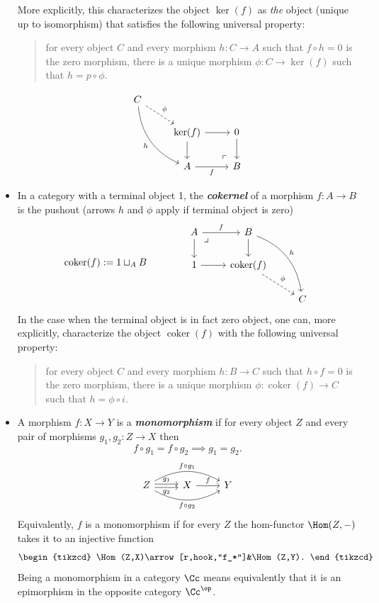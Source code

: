 \begin{defn}
\begin{itemize}
		More explicitly, this characterizes the object $\ker(f)$ as \textit{the} object (unique up to isomorphism) that satisfies the following universal property:
		\begin{quote}
			for every object $C$ and every morphism $h:C\to A$ such that $f\circ h=0$ is the zero morphism, there is a unique morphism $\phi:C\to\ker(f)$ such that $h=p\circ\phi$.
		\end{quote}
		\[\begin{tikzcd}
			C\arrow[dr,dashed,"\phi"]\arrow[ddr,bend right,swap,"h"]\\
			&\ker(f)\arrow[d]\arrow[r]&0\arrow[d]\\
			&A\arrow[r,"f",swap]&B\arrow[ul, phantom, "\ulcorner", very near start]
		\end{tikzcd}\]
		\item In a category with a terminal object 1, the \textbf{\textit{cokernel}} of a morphism $f:A\to B$ is the pushout (arrows $h$ and $\phi$ apply if terminal object is zero)
		\[\operatorname{coker}(f):=1\sqcup_AB\qquad\qquad\begin{tikzcd}
			A\arrow[r,"f"]\arrow[d]\arrow[dr, phantom, "\lrcorner", very near start]&B\arrow[d]\arrow[rdd,bend left,"h"]\\
			1\arrow[r]&\operatorname{coker}(f)\arrow[dr,dashed,"\phi"]\\
			&&C
		\end{tikzcd}\]
		In the case when the terminal object is in fact zero object, one can, more explicitly, characterize the object $\operatorname{coker}(f)$ with the following universal property:
		\begin{quote}
			for every object $C$ and every morphism $h:B\to C$ such that $h\circ f=0$ is the zero morphism, there is a unique morphism $\phi:\operatorname{coker}(f)\to C$ such that $h=\phi\circ i$.
		\end{quote}
		
		\item A morphism $f:X\to Y$ is a \textbf{\textit{monomorphism}} if for every object $Z$ and every pair of morphisms $g_1,g_2:Z\to X$ then
		\[f\circ g_1=f\circ g_2\implies g_1=g_2.\]
		\[\begin{tikzcd}
			Z\arrow[r,shift={(0,.06)},"g_1"]\arrow[r,swap,shift={(0,-.06)},"g_2"]\arrow[rr,bend left,"f\circ g_1"]\arrow[rr,bend right,swap,"f\circ g_2"]&X\arrow[r,"f"]&Y
		\end{tikzcd}\]
		Equivalently, $f$ is a monomorphism if for every $Z$ the hom-functor $\Hom(Z,-)$ takes it to an injective function
		\[\begin{tikzcd}
			\Hom(Z,X)\arrow[r,hook,"f_*"]&\Hom(Z,Y).
		\end{tikzcd}\]
		Being a monomorphism in a category $\Cc$ means equivalently that it is an epimorphism in the opposite category $\Cc^{\op}$.
		

\end{itemize}
\end{defn}
